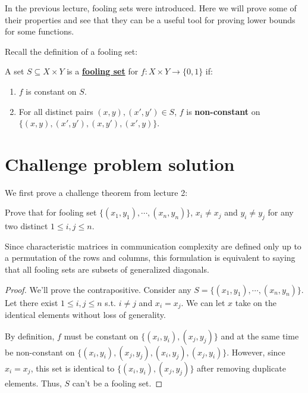 \documentclass[letterpaper]{article}
\begin{document}

\noindent
In the previous lecture, fooling sets were introduced.
Here we will prove some of their properties and see
that they can be a useful tool for proving lower bounds for some functions.

Recall the definition of a fooling set:
\begin{definition}
    A set $S \subseteq X \times Y$ is a \underline{\textbf{fooling set}}
    for $f: X \times Y \to \{0, 1\}$ if:
    \begin{enumerate}
        \item $f$ is constant on $S$.
        \item For all distinct pairs $(x, y), (x', y') \in S$, $f$ is \textbf{non-constant} on \\
              $\{(x, y), (x', y'), (x, y'), (x', y)\}$.
    \end{enumerate}
\end{definition}

\section{Challenge problem solution}

We first prove a challenge theorem from lecture 2:
\begin{problem}
Prove that for fooling set $\{(x_1, y_1), \cdots, (x_n, y_n)\}$,
$x_i \ne x_j$ and $y_i \ne y_j$ for any two distinct $1 \le i, j \le n$.
\end{problem}

\noindent
Since characteristic matrices in communication complexity are defined only up to
a permutation of the rows and columns, this formulation is equivalent to saying
that all fooling sets are subsets of generalized diagonals.

\begin{proof}
    We'll prove the contrapositive.
    Consider any $S=\{(x_1, y_1), \cdots, (x_n, y_n)\}$.
    Let there exist $1 \le i, j \le n$ s.t. $i \ne j$ and $x_i = x_j$.
    We can let $x$ take on the identical elements without loss of generality.

    By definition, $f$ must be constant on $\{(x_i, y_i), (x_j, y_j)\}$
    and at the same time be non-constant on $\{(x_i, y_i), (x_j, y_j), (x_i, y_j), (x_j, y_i)\}$.
    However, since $x_i=x_j$, this set is identical to $\{(x_i, y_i), (x_j, y_j)\}$
    after removing duplicate elements.
    Thus, $S$ can't be a fooling set.
\end{proof}
\end{document}
